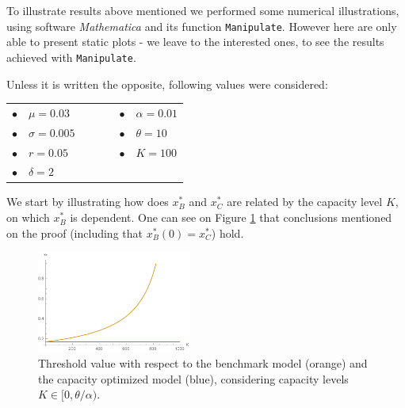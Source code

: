 To illustrate results above mentioned we performed some numerical illustrations, using software \textit{Mathematica} and its function \texttt{Manipulate}. However here are only able to present static plots - we leave to the interested ones, to see the results achieved with \texttt{Manipulate}.

Unless it is written the opposite, following values were considered:


\begin{table}[!htb]
	\centering
	\begin{tabular}{lllllll}
		 $\bullet$ & $\mu=0.03$     &  & \hspace{7cm} &  &  $\bullet$ & $\alpha=0.01$ \\
		 $\bullet$ & $\sigma=0.005$ &  & \hspace{7cm} &  &  $\bullet$ & $\theta=10$   \\
		 $\bullet$ & $r=0.05$       &  & \hspace{7cm} &  &  $\bullet$ & $K=100$       \\
		 $\bullet$ & $\delta=2$     &  & \hspace{7cm} &  &                                    
	\end{tabular}
\end{table}



We start by illustrating how does $x^*_B$ and $x^*_C$ are related by the capacity level $K$, on which $x^*_B$ is dependent. One can see on Figure \ref{fig:Kvar} that conclusions mentioned on the proof (including that $x^*_B(0)=x^*_C$) hold.

\begin{figure}[!htb]
	\centering
	\includegraphics[width=0.45\textwidth]{Prob1_CapOpt/xopt_kvar.pdf}
	\caption{Threshold value with respect to the benchmark model (orange) and the capacity optimized model (blue), considering capacity levels $K \in [0, \theta/\alpha)$.}
	\label{fig:Kvar}
\end{figure}


